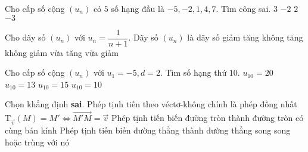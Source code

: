 \begin{ex}%
Cho cấp số cộng $ \left(u_n\right) $ có $ 5 $ số hạng đầu là $ -5, -2, 1, 4, 7 $. Tìm công sai.
\choice
{\True $ 3 $}
{$ -2 $}
{$ 2 $}
{$ -3 $}
\end{ex}

\begin{ex}%
Cho dãy số $ \left(u_n\right) $ với $ u_n=\dfrac{1}{n+1} $. Dãy số $ \left(u_n\right) $ là dãy số
\choice
{\True giảm}
{tăng}
{không tăng không giảm}
{vừa tăng vừa giảm}
\end{ex}

\begin{ex}%
Cho cấp số cộng $ \left(u_n\right) $ với $ u_1=-5, d=2 $. Tìm số hạng thứ $ 10 $.
\choice
{$ u_{10}=20 $}
{\True $ u_{10}=13 $}
{$ u_{10}=15 $}
{$ u_{10}=10 $}
\end{ex}

\begin{ex}%
Chọn khẳng định {\bf sai}.
\choice
{Phép tịnh tiến theo véctơ-không chính là phép đồng nhất}
{\True $ \mathrm{T}_{\vec{v}}(M)=M'\Leftrightarrow \overrightarrow{M'M}=\vec{v}$}
{Phép tịnh tiến biến đường tròn thành đường tròn có cùng bán kính}
{Phép tịnh tiến biến đường thẳng thành đường thẳng song song hoặc trùng với nó}
\end{ex} 

